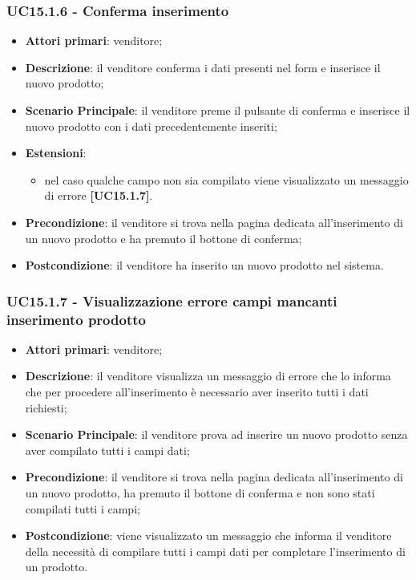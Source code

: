\subsubsection{UC15.1.6 - Conferma inserimento}
\begin{itemize}
\item \textbf{Attori primari}: venditore;
\item \textbf{Descrizione}: il venditore conferma i dati presenti nel form e inserisce il nuovo prodotto;
\item \textbf{Scenario Principale}: il venditore preme il pulsante di conferma e inserisce il nuovo prodotto con i dati precedentemente inseriti;
\item \textbf{Estensioni}: 
\begin{itemize}
\item nel caso qualche campo non sia compilato viene visualizzato un messaggio di errore \textbf{[UC15.1.7]}.
\end{itemize} 
\item \textbf{Precondizione}: il venditore si trova nella pagina dedicata all'inserimento di un nuovo prodotto e ha premuto il bottone di conferma;
\item \textbf{Postcondizione}: il venditore ha inserito un nuovo prodotto nel sistema.
\end{itemize}

\subsubsection{UC15.1.7 - Visualizzazione errore campi mancanti inserimento prodotto}
\begin{itemize}
\item \textbf{Attori primari}: venditore;
\item \textbf{Descrizione}: il venditore visualizza un messaggio di errore che lo informa che per procedere all'inserimento è necessario aver inserito tutti i dati richiesti;
\item \textbf{Scenario Principale}: il venditore prova ad inserire un nuovo prodotto senza aver compilato tutti i campi dati;
\item \textbf{Precondizione}: il venditore si trova nella pagina dedicata all'inserimento di un nuovo prodotto, ha premuto il bottone di conferma e non sono stati compilati tutti i campi;
\item \textbf{Postcondizione}: viene visualizzato un messaggio che informa il venditore della necessità di compilare tutti i campi dati per completare l'inserimento di un prodotto.
\end{itemize}


